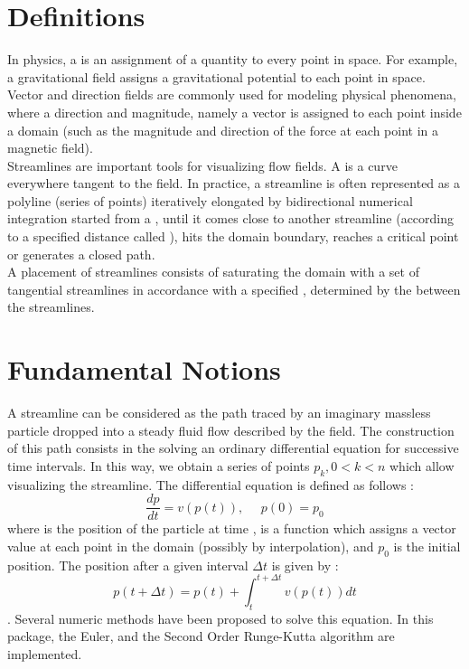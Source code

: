 \section{Definitions}
\label{Section_2D_Streamlines_Definitions}

In physics, a  is an assignment of a quantity to every
point in space. For example, a gravitational field assigns a
gravitational potential to each point in space.\\

Vector and direction fields are commonly used for modeling physical
phenomena, where a direction and magnitude, namely a vector is assigned to
each point inside a domain (such as the magnitude and direction of the
force at each point in a magnetic field).\\

Streamlines are important tools for visualizing flow fields. A
 is a curve everywhere tangent to the field. In practice, 
a streamline is often represented as a polyline (series of points)
iteratively elongated by bidirectional numerical integration started
from a , until it comes close to another streamline
(according to a specified distance called ), hits the domain boundary, reaches a critical point or
generates a closed path.\\

A  placement of streamlines consists of saturating the
domain with a set of tangential streamlines in accordance with a
specified , determined by the 
between the streamlines.

\section{Fundamental Notions}
\label{Section_2D_Streamlines_Fundamental_notions}

A streamline can be considered as the path traced by an imaginary
massless particle dropped into a steady fluid flow described by the
field. The construction of this path consists in the solving an
ordinary differential equation for successive time intervals. In this
way, we obtain a series of points $p_k, 0<k<n$ which allow visualizing
the streamline. The differential equation is defined as follows :
$$\frac{dp}{dt} = v(p(t)), \ \ \ \ \ \ p(0) = p_0$$ where  is the
position of the particle at time ,  is a function which
assigns a vector value at each point in the domain (possibly by
interpolation), and $p_0$ is the initial position.  The position after
a given interval $\Delta t$ is given by : $$p(t + \Delta t) = p(t) +
\int_t^{t+\Delta t} v(p(t)) dt$$. Several numeric methods have been
proposed to solve this equation. In this package, the Euler, and the
Second Order Runge-Kutta algorithm are implemented.

